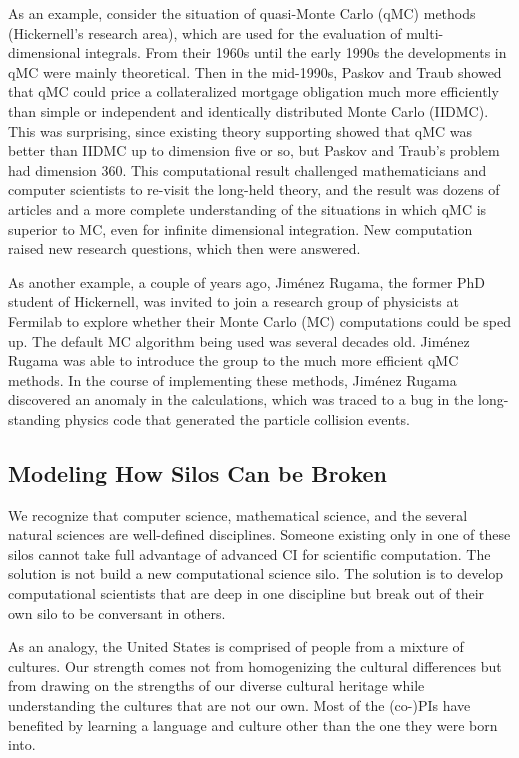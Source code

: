 \documentclass[11pt]{NSFamsart}
\begin{document}
As an example, consider the situation of quasi-Monte Carlo (qMC) methods (Hickernell's research area), which are used for the evaluation of multi-dimensional integrals. From their 1960s until the early 1990s the developments in qMC were mainly theoretical.  Then in the mid-1990s, Paskov and Traub \cite{PasTra95} showed that qMC could price a collateralized mortgage obligation much more efficiently than simple or independent and identically distributed Monte Carlo (IIDMC).  This was surprising, since existing theory supporting showed that qMC was better than IIDMC up to dimension five or so, but Paskov and Traub's problem had dimension 360.  This computational result challenged mathematicians and computer scientists to re-visit the long-held theory, and the result was dozens of articles and a more complete understanding of the situations in which qMC is superior to MC, even for infinite dimensional integration.  New computation raised new research questions, which then were answered.

As another example, a couple of years ago, Jim\'enez Rugama, the former PhD student of Hickernell, was invited to join a research group of physicists at Fermilab to explore whether their Monte Carlo (MC) computations could be sped up.  The default MC algorithm being used was several decades old.  Jim\'enez Rugama was able to introduce the group to the much more efficient qMC methods.  In the course of implementing these methods, Jim\'enez Rugama discovered an anomaly in the calculations, which was traced to a bug in the long-standing physics code that generated the particle collision events.

\subsection{Modeling How Silos Can be Broken}
We recognize that computer science, mathematical science, and the several natural sciences are well-defined disciplines.  Someone existing only in one of these silos cannot take full advantage of advanced CI for scientific computation.  The solution is not build a new computational science silo.  The solution is to develop computational scientists that are deep in one discipline but break out of their own silo to be conversant in others.

As an analogy, the United States is comprised of people from a mixture of cultures.  Our strength comes not from homogenizing the cultural differences but from drawing on the strengths of our diverse cultural heritage while understanding the cultures that are not our own.  Most of the (co-)PIs have benefited by learning a language and culture other than the one they were born into.
\end{document}
